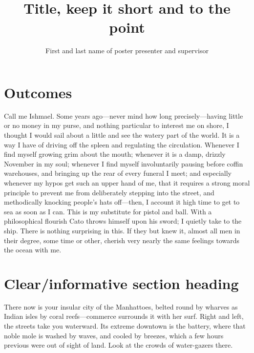 \documentclass[a4paper, twocolumn, 12pt]{article}
\title{Title, keep it short and to the point}
\author{First and last name of poster presenter and supervisor}
\date{}
\newlength{\gridv}\setlength{\gridv}{0.11111111111111111\paperheight}
\newlength{\gridh}\setlength{\gridh}{0.04761904761904762\paperwidth}
\begin{document}
\maketitle
\thispagestyle{empty}
\section*{Outcomes}
Call me Ishmael. Some years ago—never mind how long precisely—having little or
no money in my purse, and nothing particular to interest me on shore, I thought
I would sail about a little and see the watery part of the world. It is a way I
have of driving off the spleen and regulating the circulation. Whenever I find
myself growing grim about the mouth; whenever it is a damp, drizzly November in
my soul; whenever I find myself involuntarily pausing before coffin warehouses,
and bringing up the rear of every funeral I meet; and especially whenever my
hypos get such an upper hand of me, that it requires a strong moral principle to
prevent me from deliberately stepping into the street, and methodically knocking
people’s hats off—then, I account it high time to get to sea as soon as I
can. This is my substitute for pistol and ball. With a philosophical flourish
Cato throws himself upon his sword; I quietly take to the ship. There is nothing
surprising in this. If they but knew it, almost all men in their degree, some
time or other, cherish very nearly the same feelings towards the ocean with me.

\section*{Clear/informative section heading}
There now is your insular city of the Manhattoes, belted round by wharves as
Indian isles by coral reefs—commerce surrounds it with her surf. Right and left,
the streets take you waterward. Its extreme downtown is the battery, where that
noble mole is washed by waves, and cooled by breezes, which a few hours previous
were out of sight of land. Look at the crowds of water-gazers there.
\end{document}
